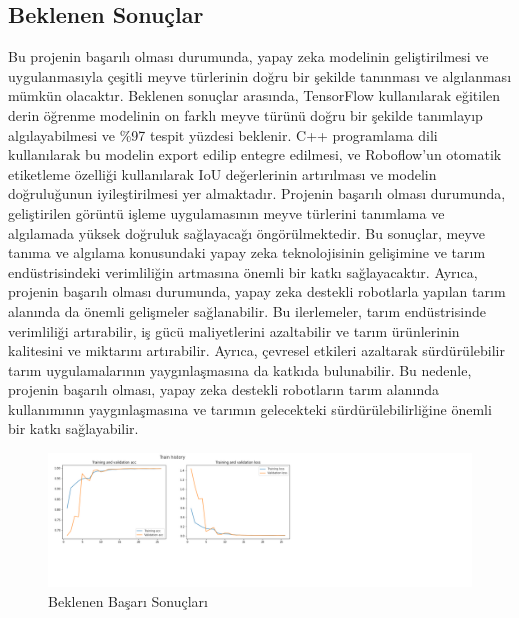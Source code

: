 \documentclass[12pt,a4paper]{article}
\begin{document}
\begin{center}
\begin{enumerate}
\begin{enumerate}
				
				\clearpage
				
				\begin{center}
					\section*{Beklenen Sonuçlar}
				\end{center}
				Bu projenin başarılı olması durumunda, yapay zeka modelinin geliştirilmesi ve uygulanmasıyla çeşitli meyve türlerinin doğru bir şekilde tanınması ve algılanması mümkün olacaktır. Beklenen sonuçlar arasında, TensorFlow kullanılarak eğitilen derin öğrenme modelinin on farklı meyve türünü doğru bir şekilde tanımlayıp algılayabilmesi ve \%97 tespit yüzdesi beklenir. C++ programlama dili kullanılarak bu modelin export edilip entegre edilmesi, ve Roboflow'un otomatik etiketleme özelliği kullanılarak IoU değerlerinin artırılması ve modelin doğruluğunun iyileştirilmesi yer almaktadır. Projenin başarılı olması durumunda, geliştirilen görüntü işleme uygulamasının meyve türlerini tanımlama ve algılamada yüksek doğruluk sağlayacağı öngörülmektedir. Bu sonuçlar, meyve tanıma ve algılama konusundaki yapay zeka teknolojisinin gelişimine ve tarım endüstrisindeki verimliliğin artmasına önemli bir katkı sağlayacaktır.				
				Ayrıca, projenin başarılı olması durumunda, yapay zeka destekli robotlarla yapılan tarım alanında da önemli gelişmeler sağlanabilir. Bu ilerlemeler, tarım endüstrisinde verimliliği artırabilir, iş gücü maliyetlerini azaltabilir ve tarım ürünlerinin kalitesini ve miktarını artırabilir. Ayrıca, çevresel etkileri azaltarak sürdürülebilir tarım uygulamalarının yaygınlaşmasına da katkıda bulunabilir. Bu nedenle, projenin başarılı olması, yapay zeka destekli robotların tarım alanında kullanımının yaygınlaşmasına ve tarımın gelecekteki sürdürülebilirliğine önemli bir katkı sağlayabilir.
				
					\begin{figure}[h]
						
						\includegraphics[width=1.4\textwidth]{expectation.png}
					
					\caption{Beklenen Başarı Sonuçları}
					\label{fig:grafik}
					\end{figure}
				

\end{enumerate}
\end{enumerate}
\end{center}
\end{document}
